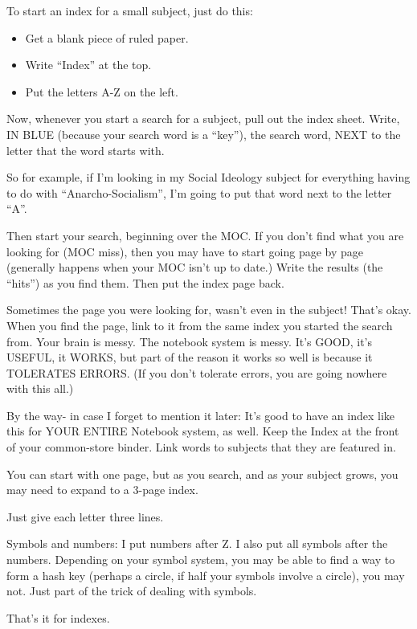 \documentclass[oneside]{book}
\begin{document}
  To start an index for a small subject, just do this:

\begin{itemize}
\item Get a blank piece of ruled paper.
\item Write ``Index'' at the top.
\item Put the letters A-Z on the left.
\end{itemize}

  Now, whenever you start a search for a subject, pull out the index
sheet. Write, IN BLUE (because your search word is a ``key''), the
search word, NEXT to the letter that the word starts with.

  So for example, if I'm looking in my Social Ideology subject for
everything having to do with ``Anarcho-Socialism'', I'm going to put
that word next to the letter ``A''.

  Then start your search, beginning over the MOC. If you don't find
what you are looking for (MOC miss), then you may have to start going
page by page (generally happens when your MOC isn't up to date.) Write
the results (the ``hits'') as you find them. Then put the index page
back.

  Sometimes the page you were looking for, wasn't even in the subject!
That's okay. When you find the page, link to it from the same index
you started the search from. Your brain is messy. The notebook system
is messy. It's GOOD, it's USEFUL, it WORKS, but part of the reason it
works so well is because it TOLERATES ERRORS. (If you don't tolerate
errors, you are going nowhere with this all.)

  By the way- in case I forget to mention it later: It's good to have
an index like this for YOUR ENTIRE Notebook system, as well. Keep the
Index at the front of your common-store binder. Link words to subjects
that they are featured in.

  You can start with one page, but as you search, and as your subject
grows, you may need to expand to a 3-page index.

  Just give each letter three lines.

  Symbols and numbers:
  I put numbers after Z.
  I also put all symbols after the numbers.
  Depending on your symbol system, you may be able to find a way to
form a hash key (perhaps a circle, if half your symbols involve a
circle), you may not. Just part of the trick of dealing with symbols.

  That's it for indexes.
\end{document}
